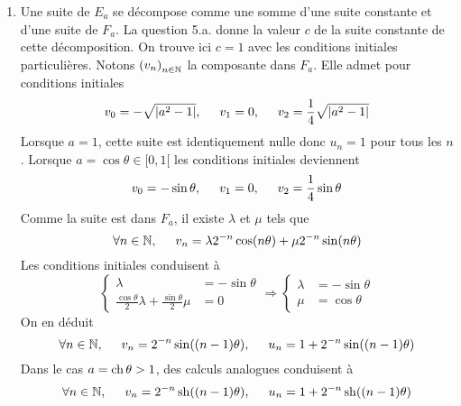 \begin{enumerate}
\item Une suite de $E_a$ se décompose comme une somme d'une suite constante et d'une suite de $F_a$. La question 5.a. donne la valeur $c$ de la suite constante de cette décomposition. On trouve ici $c=1$ avec les conditions initiales particulières. Notons $\left( v_n\right) _{n\in \mathbb{N}}$ la composante dans $F_a$. Elle admet pour conditions initiales
\begin{displaymath}
 v_0=-\sqrt{|a^2-1|},\hspace{0.5cm} v_1 = 0,\hspace{0.5cm} v_2 = \frac{1}{4}\sqrt{|a^2-1|}
\end{displaymath}
Lorsque $a=1$, cette suite est identiquement nulle donc $u_n=1$ pour tous les $n$.\newline
Lorsque $a=\cos \theta\in [0,1[$ les conditions initiales deviennent
\begin{displaymath}
 v_0=-\sin \theta,\hspace{0.5cm} v_1 = 0,\hspace{0.5cm} v_2 = \frac{1}{4}\sin \theta
\end{displaymath}
Comme la suite est dans $F_a$, il existe $\lambda$ et $\mu$ tels que 
\begin{displaymath}
 \forall n\in \mathbb{N},\hspace{0.5cm}v_n = \lambda 2^{-n}\cos(n\theta) + \mu2^{-n}\sin(n\theta)
\end{displaymath}
Les conditions initiales conduisent à
\begin{displaymath}
 \left\lbrace 
\begin{aligned}
\lambda &= -\sin \theta\\
\frac{\cos \theta}{2}\lambda + \frac{\sin \theta}{2}\mu &=0 
\end{aligned}
\right. 
\Rightarrow
 \left\lbrace 
\begin{aligned}
\lambda &= -\sin \theta\\
\mu &= \cos \theta 
\end{aligned}
\right. 
\end{displaymath}
On en déduit
\begin{displaymath}
 \forall n\in \mathbb{N},\hspace{0.5cm}v_n = 2^{-n}\sin((n-1)\theta),\hspace{0.5cm} u_n= 1 +2^{-n}\sin((n-1)\theta)
\end{displaymath}
Dans le cas $a=\operatorname{ch}\theta >1$, des calculs analogues conduisent à 
\begin{displaymath}
 \forall n\in \mathbb{N},\hspace{0.5cm}v_n = 2^{-n}\operatorname{sh}((n-1)\theta),\hspace{0.5cm} u_n= 1 +2^{-n}\operatorname{sh}((n-1)\theta)
\end{displaymath}

\end{enumerate}